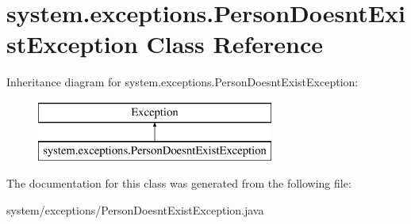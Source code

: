 \hypertarget{classsystem_1_1exceptions_1_1_person_doesnt_exist_exception}{}\section{system.\+exceptions.\+Person\+Doesnt\+Exist\+Exception Class Reference}
\label{classsystem_1_1exceptions_1_1_person_doesnt_exist_exception}
Inheritance diagram for system.\+exceptions.\+Person\+Doesnt\+Exist\+Exception\+:\begin{figure}[H]
\begin{center}
\leavevmode
\includegraphics[height=2.000000cm]{classsystem_1_1exceptions_1_1_person_doesnt_exist_exception}
\end{center}
\end{figure}


The documentation for this class was generated from the following file\+:\begin{DoxyCompactItemize}
\item 
system/exceptions/Person\+Doesnt\+Exist\+Exception.\+java\end{DoxyCompactItemize}
